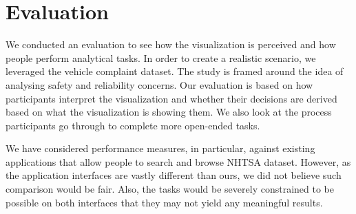 % 


\section{Evaluation}
We conducted an evaluation to see how the visualization is perceived and how
people perform analytical tasks. In order to create a realistic scenario, we
leveraged the vehicle complaint dataset. The study is framed around the idea of
analysing safety and reliability concerns. Our evaluation is based on how
participants interpret the visualization and  whether their decisions are
derived based on what the visualization is showing them. We also look at the process
participants go through to complete more open-ended tasks.


We have considered performance measures, in particular, against existing applications
that allow people to search and browse NHTSA dataset. However, as the application
interfaces are vastly different than ours, we did not believe such comparison would
be fair. Also, the tasks would be severely constrained to be possible on both
interfaces that they may not yield any meaningful results.

